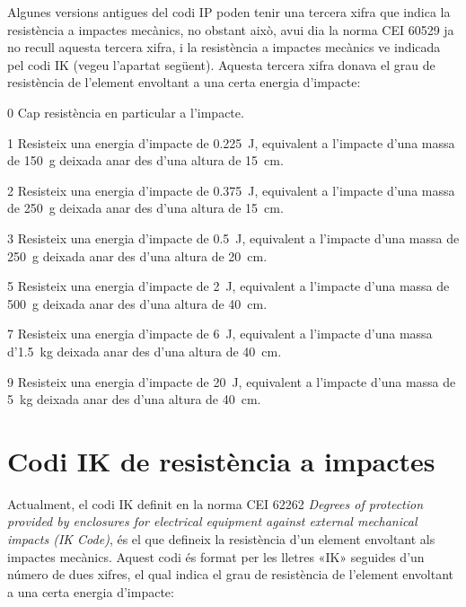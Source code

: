 Algunes versions antigues del codi IP poden tenir una tercera xifra que indica la resistència a impactes mecànics, no obstant això, avui  dia la norma CEI 60529 ja no recull aquesta tercera xifra, i la resistència a impactes mecànics ve indicada pel codi IK (vegeu l'apartat següent). Aquesta tercera xifra donava el grau de resistència de l'element envoltant a una certa energia d'impacte:
\begin{list}{}
   {\setlength{\labelwidth}{10mm} \setlength{\leftmargin}{15mm} \setlength{\labelsep}{5mm}}
   \item[0] Cap resistència en particular a l'impacte.
   \item[1] Resisteix una energia d'impacte de \qty{0,225}{J}, equivalent a l'impacte d'una massa de \qty{150}{g} deixada anar des d'una altura de \qty{15}{cm}.
   \item[2] Resisteix una energia d'impacte de \qty{0,375}{J}, equivalent a l'impacte d'una massa de \qty{250}{g} deixada anar des d'una altura de \qty{15}{cm}.
   \item[3] Resisteix una energia d'impacte de \qty{0,5}{J}, equivalent a l'impacte d'una massa de \qty{250}{g} deixada anar des d'una altura de \qty{20}{cm}.
   \item[5] Resisteix una energia d'impacte de \qty{2}{J}, equivalent a l'impacte d'una massa de \qty{500}{g} deixada anar des d'una altura de \qty{40}{cm}.
   \item[7] Resisteix una energia d'impacte de \qty{6}{J}, equivalent a l'impacte d'una massa d'\qty{1,5}{kg} deixada anar des d'una altura de \qty{40}{cm}.
   \item[9]Resisteix una energia d'impacte de \qty{20}{J}, equivalent a l'impacte d'una massa de \qty{5}{kg} deixada anar des d'una altura de \qty{40}{cm}.
\end{list}

\section{Codi IK de resistència a impactes}\label{sec:codi-IK}   

Actualment, el codi IK definit en la norma CEI 62262 \textit{Degrees of protection provided by enclosures for electrical equipment against external mechanical impacts (IK Code)}, és el que defineix la resistència d'un element  envoltant als impactes mecànics. Aquest codi és format per les lletres «IK» seguides d'un número de dues xifres, el qual indica el grau de resistència de l'element envoltant a una certa energia d'impacte:


